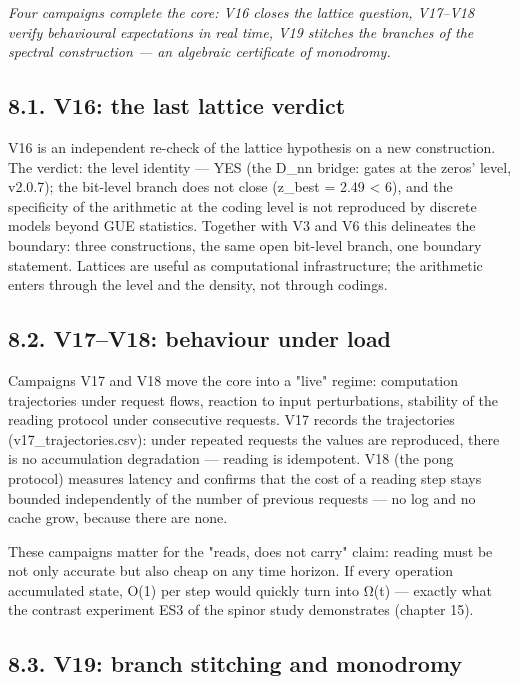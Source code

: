 \documentclass[11pt,a4paper]{article}
\begin{document}
\noindent\textit{\color{copper}Four campaigns complete the core: V16 closes the lattice question, V17–V18 verify behavioural expectations in real time, V19 stitches the branches of the spectral construction — an algebraic certificate of monodromy.}

\subsection{8.1. V16: the last lattice verdict}

V16 is an independent re-check of the lattice hypothesis on a new construction. The verdict: the level identity — YES (the D\_nn bridge: gates at the zeros' level, v2.0.7); the bit-level branch does not close (z\_best = 2.49 < 6), and the specificity of the arithmetic at the coding level is not reproduced by discrete models beyond GUE statistics. Together with V3 and V6 this delineates the boundary: three constructions, the same open bit-level branch, one boundary statement. Lattices are useful as computational infrastructure; the arithmetic enters through the level and the density, not through codings.

\subsection{8.2. V17–V18: behaviour under load}

Campaigns V17 and V18 move the core into a "live" regime: computation trajectories under request flows, reaction to input perturbations, stability of the reading protocol under consecutive requests. V17 records the trajectories (v17\_trajectories.csv): under repeated requests the values are reproduced, there is no accumulation degradation — reading is idempotent. V18 (the pong protocol) measures latency and confirms that the cost of a reading step stays bounded independently of the number of previous requests — no log and no cache grow, because there are none.

These campaigns matter for the "reads, does not carry" claim: reading must be not only accurate but also cheap on any time horizon. If every operation accumulated state, O(1) per step would quickly turn into Ω(t) — exactly what the contrast experiment ES3 of the spinor study demonstrates (chapter 15).

\subsection{8.3. V19: branch stitching and monodromy}
\end{document}
